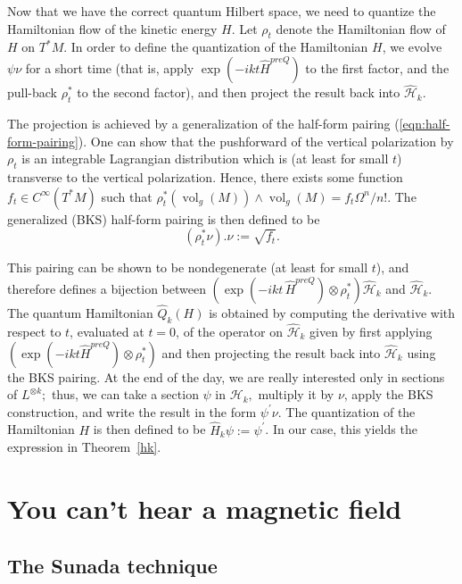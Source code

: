 \documentclass[12pt,leqno]{amsart}%
\theoremstyle{definition}
\theoremstyle{remark}
\numberwithin{equation}{section}
\def\vol{\operatorname{vol}}
\begin{document}
\medskip

Now that we have the correct quantum Hilbert space, we need to quantize the
Hamiltonian flow of the kinetic energy $H$. Let $\rho_{t}$ denote the
Hamiltonian flow of $H$ on $T^{\ast}M$. In order to
define the quantization of the Hamiltonian $H$, we evolve $\psi\nu$ for a short
time (that is, apply $\exp(-ikt\widehat{H}^{preQ})$ to the first factor, and the
pull-back $\rho_{t}^{\ast}$ to the second factor), and then project the result
back into $\widehat{\mathcal{H}}_{k}.$

The projection is achieved by a generalization of the half-form pairing
(\ref{eqn:half-form-pairing}). One can show that the pushforward of the vertical
polarization by $\rho_{t}$ is an integrable
Lagrangian distribution which is (at least for small $t$) transverse to the
vertical polarization. Hence, there exists some function $f_{t}\in
C^{\infty}(T^{\ast}M)$ such that
$\rho_{t}^{\ast}(\vol_g(M))\wedge\vol_g(M)=f_{t}\Omega^{n}/n!$. The generalized
(BKS) half-form pairing is
then defined to be
\[
\left(  \rho_{t}^{\ast}\nu\right)  .\nu:=\sqrt{f_{t}}.
\]


This pairing can be shown to be nondegenerate (at least for small $t$), and
therefore defines a bijection between
$(\exp(-ikt\,\widehat{H}^{preQ})\otimes\rho_{t}^{\ast})\widehat{\mathcal{H}}_{k}$
and $\widehat{\mathcal{H}}_{k}.$ The quantum Hamiltonian $\widehat{Q}_{k}(H)$ is
obtained by computing the derivative with respect to $t$, evaluated at $t=0$, of
the operator on $\widehat{\mathcal{H}}_{k}$ given by first applying
$(\exp(-ikt\widehat{H}^{preQ})\otimes\rho_{t}^{\ast})$ and then projecting the
result back into $\widehat{\mathcal{H}}_{k}$ using the BKS pairing. At the end
of the day, we are really interested only in sections of $L^{\otimes k};$ thus,
we can take a section $\psi$ in $\mathcal{H}_{k},$ multiply it by $\nu$, apply
the BKS construction, and write the result in the form $\psi^{\prime}\nu.$ The
quantization of the Hamiltonian $H$ is then defined to be
$\widehat{H}_{k}\psi:=\psi^{\prime}$. In our case, this yields the expression in
Theorem~\ref{hk}.


\section{You can't hear a magnetic field}

\subsection{The Sunada technique}\label{st}
\end{document}
